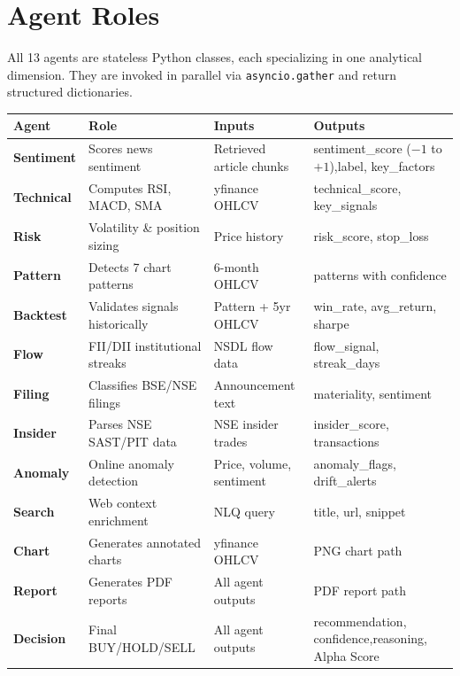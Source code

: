 \documentclass[11pt, a4paper]{article}
\begin{document}
\section{Agent Roles}

All 13 agents are stateless Python classes, each specializing in one analytical dimension.
They are invoked in parallel via \texttt{asyncio.gather} and return structured dictionaries.

\begin{center}
\scriptsize
\begin{tabular}{L{2.0cm} L{3.8cm} L{3.2cm} L{3.2cm}}
  \toprule
  \textbf{Agent} & \textbf{Role} & \textbf{Inputs} & \textbf{Outputs} \\
  \midrule
  \textbf{Sentiment} & Scores news sentiment & Retrieved article chunks & sentiment\_score ($-1$ to $+1$),\newline label, key\_factors \\[4pt]
  \textbf{Technical} & Computes RSI, MACD, SMA & yfinance OHLCV & technical\_score, key\_signals \\[4pt]
  \textbf{Risk} & Volatility \& position sizing & Price history & risk\_score, stop\_loss \\[4pt]
  \textbf{Pattern} & Detects 7 chart patterns & 6-month OHLCV & patterns with confidence \\[4pt]
  \textbf{Backtest} & Validates signals historically & Pattern + 5yr OHLCV & win\_rate, avg\_return, sharpe \\[4pt]
  \textbf{Flow} & FII/DII institutional streaks & NSDL flow data & flow\_signal, streak\_days \\[4pt]
  \textbf{Filing} & Classifies BSE/NSE filings & Announcement text & materiality, sentiment \\[4pt]
  \textbf{Insider} & Parses NSE SAST/PIT data & NSE insider trades & insider\_score, transactions \\[4pt]
  \textbf{Anomaly} & Online anomaly detection & Price, volume, sentiment & anomaly\_flags, drift\_alerts \\[4pt]
  \textbf{Search} & Web context enrichment & NLQ query & title, url, snippet \\[4pt]
  \textbf{Chart} & Generates annotated charts & yfinance OHLCV & PNG chart path \\[4pt]
  \textbf{Report} & Generates PDF reports & All agent outputs & PDF report path \\[4pt]
  \textbf{Decision} & Final BUY/HOLD/SELL & All agent outputs & recommendation, confidence,\newline reasoning, Alpha Score \\
  \bottomrule
\end{tabular}
\end{center}
\end{document}
